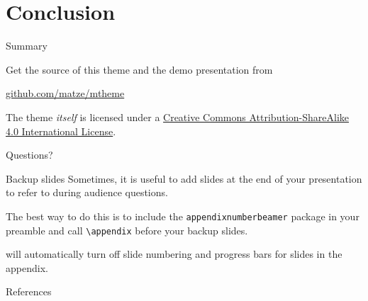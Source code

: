 \section{Conclusion}

\begin{frame}{Summary}

  Get the source of this theme and the demo presentation from

  \begin{center}\url{github.com/matze/mtheme}\end{center}

  The theme \emph{itself} is licensed under a
  \href{http://creativecommons.org/licenses/by-sa/4.0/}{Creative Commons
  Attribution-ShareAlike 4.0 International License}.

  \begin{center}\ccbysa\end{center}

\end{frame}

\begin{frame}[standout]
  Questions?
\end{frame}

\appendix

\begin{frame}[fragile]{Backup slides}
  Sometimes, it is useful to add slides at the end of your presentation to
  refer to during audience questions.

  The best way to do this is to include the \verb|appendixnumberbeamer|
  package in your preamble and call \verb|\appendix| before your backup slides.

  \themename will automatically turn off slide numbering and progress bars for
  slides in the appendix.
\end{frame}

\begin{frame}[allowframebreaks]{References}

  
  

\end{frame}

